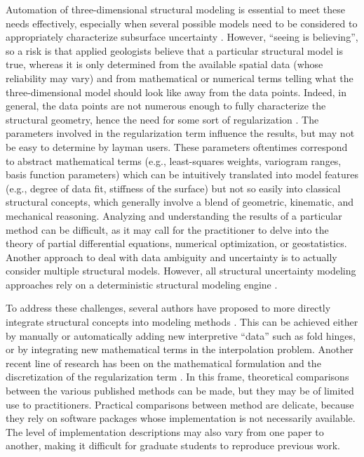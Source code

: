 \documentclass[final]{ring20}
\begin{document}
Automation of three-dimensional structural modeling is essential to meet these needs effectively, especially when several possible models need to be considered to appropriately characterize subsurface uncertainty \citep{Wellmann2018AiG}. However, ``seeing is believing'', so a risk is that applied geologists believe that a particular structural model is true, whereas it is only determined from the available spatial data (whose reliability may vary) and from mathematical or numerical terms telling what the three-dimensional model should look like away from the data points. Indeed, in general, the data points are not numerous enough to fully characterize the structural geometry, hence the need for some sort of regularization \citep[e.g.,][]{Renaudeau2019MG}. The parameters involved in the regularization term influence the results, but may not be easy to determine by layman users. These parameters oftentimes correspond to abstract mathematical terms (e.g., least-squares weights, variogram ranges, basis function parameters) which can be intuitively translated into model features (e.g., degree of data fit, stiffness of the surface) but not so easily into classical structural concepts, which generally involve a blend of geometric, kinematic, and mechanical reasoning. Analyzing and understanding the results of a particular method can be difficult, as it may call for the practitioner to delve into the theory of partial differential equations, numerical optimization, or geostatistics. Another approach to deal with data ambiguity and uncertainty is to actually consider multiple structural models. However, all structural uncertainty modeling approaches rely on a deterministic structural modeling engine \citep[see ][ and references therein]{Wellmann2018AiG}.

To address these challenges, several authors have proposed to more directly integrate structural concepts into modeling methods \citep{DeKemp2003G,Maxelon2009CG,MassiotGM2010,Laurent2016EaPSL,Grose2017JSG,Grose2018JGRSE,Grose2019JoSG}. This can be achieved either by manually or automatically adding new interpretive ``data'' such as fold hinges, or by integrating new mathematical terms in the interpolation problem. Another recent line of research has been on the mathematical formulation and the discretization of the regularization term \citep{Laurent2016MG,Martin2017CG,Irakarama2018EAGE,Renaudeau2019MG}. In this frame, theoretical comparisons between the various published methods can be made, but they may be of limited use to practitioners. Practical comparisons between method are delicate, because they rely on software packages whose implementation is not necessarily available. The level of implementation descriptions may also vary from one paper to another, making it difficult for graduate students to reproduce previous work. 
\end{document}
